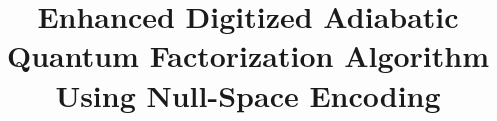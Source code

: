 \documentclass{dissertation}
\newcommand{\1}{\mathbbm{1}}
\begin{document}
\title{Enhanced Digitized Adiabatic Quantum Factorization Algorithm Using Null-Space Encoding}

\frontmatter




\thispagestyle{empty}
\tableofcontents
\let\cleardoublepage\clearpage



\mainmatter

\thumbtrue
























\appendix







\thumbfalse






\newpage
\end{document}

